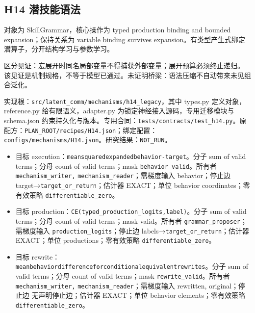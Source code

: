 \documentclass[
  10pt,
]{article}
\begin{document}
\subsection{H14 潜技能语法}\label{h14-ux6f5cux6280ux80fdux8bedux6cd5}

对象为 SkillGrammar，核心操作为 typed production binding and bounded
expansion；保持关系为 variable binding survives
expansion。有类型产生式绑定潜算子，分开结构学习与参数学习。

区分见证：宏展开时同名局部变量不得捕获外部变量；展开预算必须终止递归。
该见证是机制规格，不等于模型已通过。未证明桥梁：语法压缩不自动带来未见组合泛化。

实现根：{\small\nolinkurl{src/latent_comm/mechanisms/h14_legacy}}，其中
types.py 定义对象，reference.py 给有限语义，adapter.py
为锁定神经接入源码，专用迁移模块与 schema.json
约束持久化与版本。专用合同：{\small\nolinkurl{tests/contracts/test_h14.py}}。原配方：{\small\nolinkurl{PLAN_ROOT/recipes/H14.json}}；绑定配置：{\small\nolinkurl{configs/mechanisms/H14.json}}。研究结果：\nolinkurl{NOT_RUN}。

\begin{itemize}
\item
  目标
  execution：{\small\nolinkurl{mean}\hspace{0.333em}\nolinkurl{squared}\hspace{0.333em}\nolinkurl{expanded}\hspace{0.333em}\nolinkurl{behavior-target}}。分子
  sum of valid terms；分母 count of valid terms；mask
  \nolinkurl{behavior_valid}。所有者 \nolinkurl{mechanism_writer,}
  \nolinkurl{mechanism_reader}；需梯度输入 behavior；停止边
  target→\nolinkurl{target_or_return}；估计器 EXACT；单位 behavior
  coordinates；零有效策略 \nolinkurl{differentiable_zero}。
\item
  目标
  production：{\small\nolinkurl{CE(typed_production_logits,label)}}。分子
  sum of valid terms；分母 count of valid terms；mask valid。所有者
  \nolinkurl{grammar_proposer}；需梯度输入
  \nolinkurl{production_logits}；停止边
  labels→\nolinkurl{target_or_return}；估计器 EXACT；单位
  productions；零有效策略 \nolinkurl{differentiable_zero}。
\item
  目标
  rewrite：{\small\nolinkurl{mean}\hspace{0.333em}\nolinkurl{behavior}\hspace{0.333em}\nolinkurl{difference}\hspace{0.333em}\nolinkurl{for}\hspace{0.333em}\nolinkurl{conditional}\hspace{0.333em}\nolinkurl{equivalent}\hspace{0.333em}\nolinkurl{rewrites}}。分子
  sum of valid terms；分母 count of valid terms；mask
  \nolinkurl{rewrite_valid}。所有者 \nolinkurl{mechanism_writer,}
  \nolinkurl{mechanism_reader}；需梯度输入 rewritten, original；停止边
  无声明停止边；估计器 EXACT；单位 behavior elements；零有效策略
  \nolinkurl{differentiable_zero}。
\end{itemize}
\end{document}
